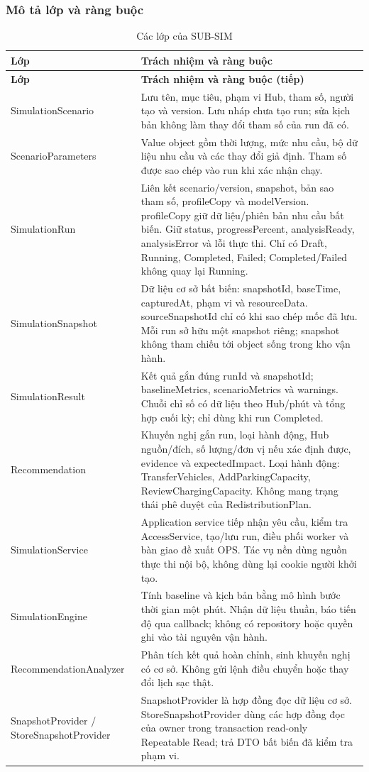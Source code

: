 \subsubsection{Mô tả lớp và ràng buộc}
\begin{longtable}{|L{39mm}|L{100mm}|}
\caption{Các lớp của SUB-SIM}\\\hline
\textbf{Lớp} & \textbf{Trách nhiệm và ràng buộc}\\\hline
\endfirsthead
\hline\textbf{Lớp} & \textbf{Trách nhiệm và ràng buộc (tiếp)}\\\hline\endhead
SimulationScenario & Lưu tên, mục tiêu, phạm vi Hub, tham số, người tạo và version. Lưu nháp chưa tạo run; sửa kịch bản không làm thay đổi tham số của run đã có.\\\hline
ScenarioParameters & Value object gồm thời lượng, mức nhu cầu, bộ dữ liệu nhu cầu và các thay đổi giả định. Tham số được sao chép vào run khi xác nhận chạy.\\\hline
SimulationRun & Liên kết scenario/version, snapshot, bản sao tham số, profileCopy và modelVersion. profileCopy giữ dữ liệu/phiên bản nhu cầu bất biến. Giữ status, progressPercent, analysisReady, analysisError và lỗi thực thi. Chỉ có Draft, Running, Completed, Failed; Completed/Failed không quay lại Running.\\\hline
SimulationSnapshot & Dữ liệu cơ sở bất biến: snapshotId, baseTime, capturedAt, phạm vi và resourceData. sourceSnapshotId chỉ có khi sao chép mốc đã lưu. Mỗi run sở hữu một snapshot riêng; snapshot không tham chiếu tới object sống trong kho vận hành.\\\hline
SimulationResult & Kết quả gắn đúng runId và snapshotId; baselineMetrics, scenarioMetrics và warnings. Chuỗi chỉ số có dữ liệu theo Hub/phút và tổng hợp cuối kỳ; chỉ dùng khi run Completed.\\\hline
Recommendation & Khuyến nghị gắn run, loại hành động, Hub nguồn/đích, số lượng/đơn vị nếu xác định được, evidence và expectedImpact. Loại hành động: TransferVehicles, AddParkingCapacity, ReviewChargingCapacity. Không mang trạng thái phê duyệt của RedistributionPlan.\\\hline
SimulationService & Application service tiếp nhận yêu cầu, kiểm tra AccessService, tạo/lưu run, điều phối worker và bàn giao đề xuất OPS. Tác vụ nền dùng nguồn thực thi nội bộ, không dùng lại cookie người khởi tạo.\\\hline
SimulationEngine & Tính baseline và kịch bản bằng mô hình bước thời gian một phút. Nhận dữ liệu thuần, báo tiến độ qua callback; không có repository hoặc quyền ghi vào tài nguyên vận hành.\\\hline
Recommendation\allowbreak Analyzer & Phân tích kết quả hoàn chỉnh, sinh khuyến nghị có cơ sở. Không gửi lệnh điều chuyển hoặc thay đổi lịch sạc thật.\\\hline
SnapshotProvider / StoreSnapshotProvider & SnapshotProvider là hợp đồng đọc dữ liệu cơ sở. StoreSnapshotProvider dùng các hợp đồng đọc của owner trong transaction read-only Repeatable Read; trả DTO bất biến đã kiểm tra phạm vi.\\\hline
\end{longtable}


